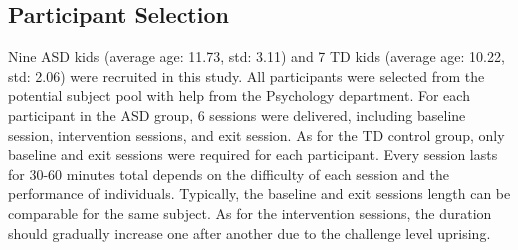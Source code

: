 \subsection{Participant Selection}
Nine ASD kids (average age: 11.73, std: 3.11) and 7 TD kids (average age: 10.22, std: 2.06) were recruited in this
study. All participants were selected from the potential subject pool with help from the Psychology department. 
For each participant in the ASD group, 6 sessions were delivered, including baseline session,
intervention sessions, and exit session. As for the TD control group, only baseline and exit sessions 
were required for each participant. Every session lasts for 30-60 minutes total depends on the difficulty
of each session and the performance of individuals. Typically, the baseline and exit sessions length 
can be comparable for the same subject. As for the intervention sessions, the duration should gradually increase
one after another due to the challenge level uprising.\\

